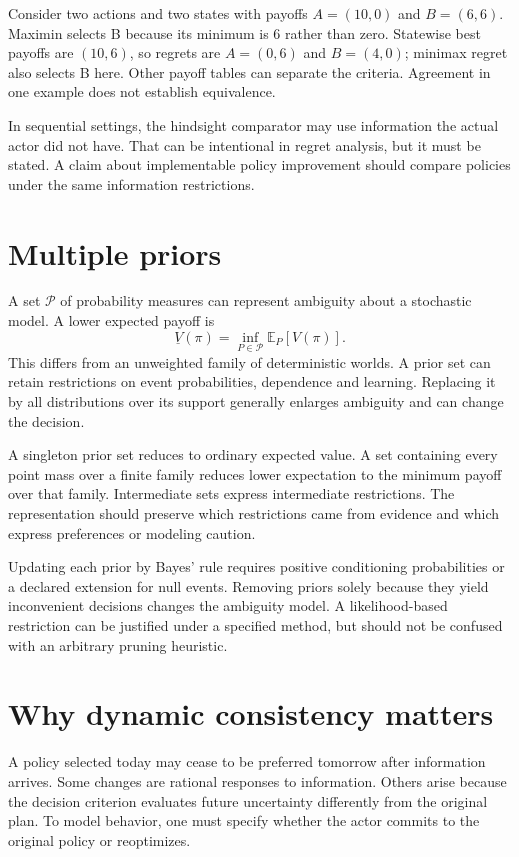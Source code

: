 Consider two actions and two states with payoffs $A=(10,0)$ and $B=(6,6)$. Maximin selects B because its minimum is 6 rather than zero. Statewise best payoffs are $(10,6)$, so regrets are $A=(0,6)$ and $B=(4,0)$; minimax regret also selects B here. Other payoff tables can separate the criteria. Agreement in one example does not establish equivalence.

In sequential settings, the hindsight comparator may use information the actual actor did not have. That can be intentional in regret analysis, but it must be stated. A claim about implementable policy improvement should compare policies under the same information restrictions.

\section{Multiple priors}
A set $\mathcal P$ of probability measures can represent ambiguity about a stochastic model. A lower expected payoff is
\begin{equation}
 \underline V(\pi)=\inf_{P\in\mathcal P}\mathbb E_P[V(\pi)].
\end{equation}
This differs from an unweighted family of deterministic worlds. A prior set can retain restrictions on event probabilities, dependence and learning. Replacing it by all distributions over its support generally enlarges ambiguity and can change the decision.

A singleton prior set reduces to ordinary expected value. A set containing every point mass over a finite family reduces lower expectation to the minimum payoff over that family. Intermediate sets express intermediate restrictions. The representation should preserve which restrictions came from evidence and which express preferences or modeling caution.

Updating each prior by Bayes' rule requires positive conditioning probabilities or a declared extension for null events. Removing priors solely because they yield inconvenient decisions changes the ambiguity model. A likelihood-based restriction can be justified under a specified method, but should not be confused with an arbitrary pruning heuristic.

\section{Why dynamic consistency matters}
A policy selected today may cease to be preferred tomorrow after information arrives. Some changes are rational responses to information. Others arise because the decision criterion evaluates future uncertainty differently from the original plan. To model behavior, one must specify whether the actor commits to the original policy or reoptimizes.

